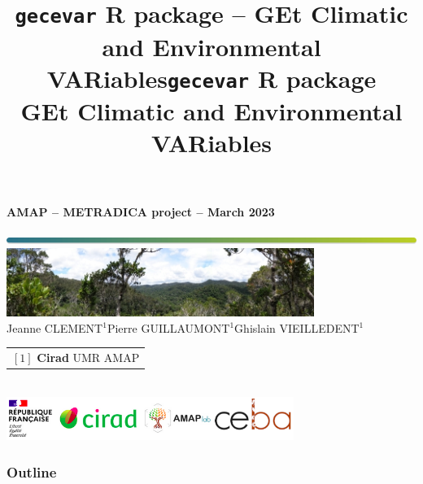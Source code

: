 \documentclass[10pt,table,dvipsnames,compress]{beamer}
\date{}
\title{\texttt{gecevar} R package -- GEt Climatic and Environmental VARiables}
\title[gecevar]{\texttt{gecevar} R package \\ GEt Climatic and Environmental VARiables}
\newif\ifplacelogo %
\begin{document}
{
  \begin{frame}
  
  \begin{center}
  \small{\textbf{AMAP -- METRADICA project -- March 2023}}
  \end{center}
  \vspace{-1cm}
  \titlepage %
  \vspace{-3.5cm}
  \begin{center}
    \includegraphics[width=\textwidth]{figs/Barre_couleur}\\
    \vspace{0.5cm}
    \includegraphics[width=10cm]{figs/Banniere}\\
    \vspace{0.3cm}
    \small{Jeanne CLEMENT$^{1}$\hspace{0.25cm}Pierre GUILLAUMONT$^{1}$\hspace{0.25cm}Ghislain VIEILLEDENT$^{1}$}\\
    \vspace{0.15cm}
    {\scriptsize
      \begin{tabular}{l}
        $[1]$ \textbf{Cirad} UMR AMAP
      \end{tabular}
    }\\
    \vspace{0.3cm}
    \includegraphics[width=0.70\textwidth]{figs/partners_logos}
    
  \end{center}
  \end{frame}
}


\placelogotrue
\begin{frame}
  \frametitle{Outline}
  \begin{columns}[c]
    \begin{column}{0.5\textwidth}
      \tableofcontents[sections=1]
      \vspace{0.5cm}
      \tableofcontents[sections=2]
    \end{column}
    \begin{column}{0.5\textwidth}
        \tableofcontents[sections=3]
        \vspace{0.5cm}
        \tableofcontents[sections=4]
    \end{column}
  \end{columns}
\end{frame}
\placelogofalse
\end{document}
